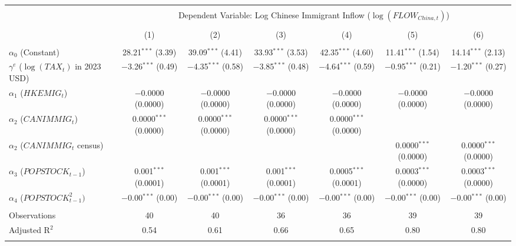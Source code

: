 
\begin{tabular}{@{\extracolsep{5pt}}lcccccc} 
\\[-1.8ex]\hline 
\hline \\[-1.8ex] 
 & \multicolumn{6}{c}{Dependent Variable: Log Chinese Immigrant Inflow ($\log(FLOW_{China, t})$)} \\ 
\cline{2-7} 
\\[-1.8ex] & (1) & (2) & (3) & (4) & (5) & (6)\\ 
\hline \\[-1.8ex] 
 $\alpha_0$ (Constant) & 28.21$^{***}$ (3.39) & 39.09$^{***}$ (4.41) & 33.93$^{***}$ (3.53) & 42.35$^{***}$ (4.60) & 11.41$^{***}$ (1.54) & 14.14$^{***}$ (2.13) \\ 
  $\gamma^e$ ($\log(TAX_t)$ in 2023 USD) & $-$3.26$^{***}$ (0.49) & $-$4.35$^{***}$ (0.58) & $-$3.85$^{***}$ (0.48) & $-$4.64$^{***}$ (0.59) & $-$0.95$^{***}$ (0.21) & $-$1.20$^{***}$ (0.27) \\ 
  $\alpha_{1}$ ($HKEMIG_{t}$) & $-$0.0000 (0.0000) & $-$0.0000 (0.0000) & $-$0.0000 (0.0000) & $-$0.0000 (0.0000) & $-$0.0000 (0.0000) & $-$0.0000 (0.0000) \\ 
  $\alpha_{2}$ ($CANIMMIG_{t}$) & 0.0000$^{***}$ (0.0000) & 0.0000$^{***}$ (0.0000) & 0.0000$^{***}$ (0.0000) & 0.0000$^{***}$ (0.0000) &  &  \\ 
  $\alpha_{2}$ ($CANIMMIG_{t}$ census) &  &  &  &  & 0.0000$^{***}$ (0.0000) & 0.0000$^{***}$ (0.0000) \\ 
  $\alpha_{3}$ ($POPSTOCK_{t-1}$) & 0.001$^{***}$ (0.0001) & 0.001$^{***}$ (0.0001) & 0.001$^{***}$ (0.0001) & 0.0005$^{***}$ (0.0001) & 0.0003$^{***}$ (0.0000) & 0.0003$^{***}$ (0.0000) \\ 
  $\alpha_{4}$ ($POPSTOCK_{t-1}^{2})$ & $-$0.00$^{***}$ (0.00) & $-$0.00$^{***}$ (0.00) & $-$0.00$^{***}$ (0.00) & $-$0.00$^{***}$ (0.00) & $-$0.00$^{***}$ (0.00) & $-$0.00$^{***}$ (0.00) \\ 
 \hline \\[-1.8ex] 
Observations & 40 & 40 & 36 & 36 & 39 & 39 \\ 
Adjusted R$^{2}$ & 0.54 & 0.61 & 0.66 & 0.65 & 0.80 & 0.80 \\ 
\hline 
\hline \\[-1.8ex] 
\end{tabular} 
